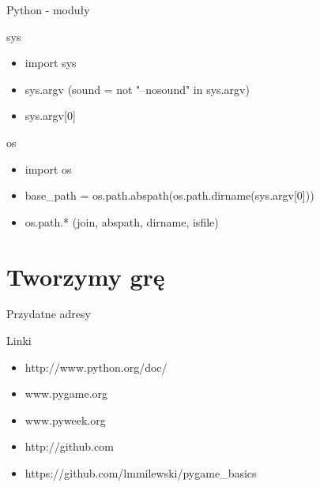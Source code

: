 \documentclass{beamer}
\begin{document}
\begin{frame}{Python - moduły}
  \begin{block}{sys}
    \begin{itemize}
    \item import sys
    \item sys.argv (sound = not "--nosound" in sys.argv)
    \item sys.argv[0]
    \end{itemize}
  \end{block}

  \begin{block}{os}
    \begin{itemize}
    \item import os
    \item base\_path = os.path.abspath(os.path.dirname(sys.argv[0]))
    \item os.path.* (join, abspath, dirname, isfile)
    \end{itemize}
  \end{block}

\end{frame}


\section{Tworzymy grę}

\begin{frame}{Przydatne adresy}
  \begin{block}{Linki}
    \begin{itemize}
    \item http://www.python.org/doc/
    \item www.pygame.org
    \item www.pyweek.org
    \item http://github.com
    \item https://github.com/lmmilewski/pygame\_basics
    \end{itemize}
  \end{block}

\end{frame}
\end{document}

